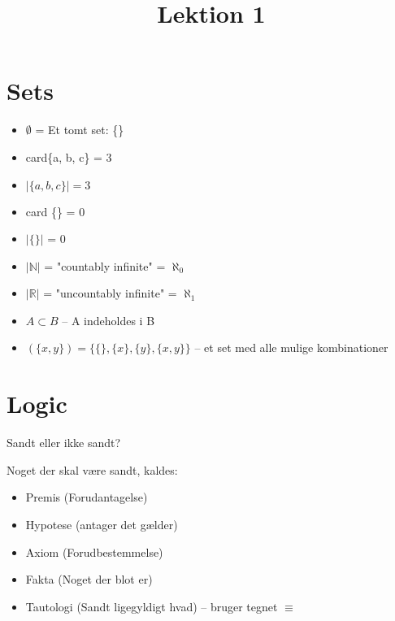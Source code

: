 \documentclass[danish,english,10pt,a4paper]{article}
\title{Lektion 1}
\begin{document}
\maketitle


\section*{Sets}
\begin{theo} 
\begin{itemize}
\item $\emptyset$ = Et tomt set: \{\}
\end{itemize}
\end{theo}


\begin{theo}[Cardinality] 
	\begin{itemize}
	\item card\{a, b, c\} = 3
	\item $|\{a, b, c\}| = 3$
	\item card \{\} = 0
	\item $|\{\}|$ = 0
	\item $|\mathbb{N}|$ = "countably infinite" = $\aleph_0$
	\item $|\mathbb{R}|$ = "uncountably infinite" = $\aleph_1$
	\end{itemize}
\end{theo}

\begin{theo} 
\begin{itemize}
\item $A \subset B $ -- A indeholdes i B
\item $(\{x,y\}) = \{\{\},\{x\},\{y\},\{x,y\}\}$ -- et set med alle mulige kombinationer
\end{itemize}
\end{theo}



\newpage
\section*{Logic}
Sandt eller ikke sandt?

\begin{theo}[Sandhed]
Noget der skal være sandt, kaldes:
\begin{itemize}
\item Premis (Forudantagelse)
\item Hypotese (antager det gælder)
\item Axiom (Forudbestemmelse)
\item Fakta (Noget der blot er)
\item Tautologi (Sandt ligegyldigt hvad) -- bruger tegnet $\equiv$
\end{itemize}
\end{theo}
\end{document}

